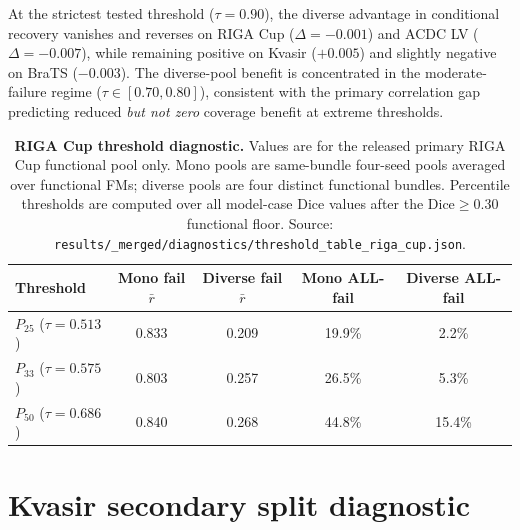 At the strictest tested threshold ($\tau{=}0.90$), the diverse advantage in conditional recovery vanishes and reverses on RIGA Cup ($\Delta{=}-0.001$) and ACDC LV ($\Delta{=}-0.007$), while remaining positive on Kvasir ($+0.005$) and slightly negative on BraTS ($-0.003$). The diverse-pool benefit is concentrated in the moderate-failure regime ($\tau\in[0.70,0.80]$), consistent with the primary correlation gap predicting reduced \emph{but not zero} coverage benefit at extreme thresholds.

\begin{table}[!htbp]
  \caption{\textbf{RIGA Cup threshold diagnostic.} Values are for the released primary RIGA Cup functional pool only. Mono pools are same-bundle four-seed pools averaged over functional FMs; diverse pools are four distinct functional bundles. Percentile thresholds are computed over all model-case Dice values after the Dice${\geq}0.30$ functional floor. Source: \texttt{results/\_merged/diagnostics/threshold\_table\_riga\_cup.json}.}
  \label{tab:threshold}
  \centering\footnotesize
  \begin{tabular}{lcccc}
    \toprule
    Threshold & Mono fail $\bar{r}$ & Diverse fail $\bar{r}$ & Mono ALL-fail & Diverse ALL-fail \\
    \midrule
    $P_{25}$ ($\tau{=}0.513$) & 0.833 & 0.209 & 19.9\% & 2.2\% \\
    $P_{33}$ ($\tau{=}0.575$) & 0.803 & 0.257 & 26.5\% & 5.3\% \\
    $P_{50}$ ($\tau{=}0.686$) & 0.840 & 0.268 & 44.8\% & 15.4\% \\
    \bottomrule
  \end{tabular}
\end{table}

\section{Kvasir secondary split diagnostic}
\label{sec:kvasir-app}


